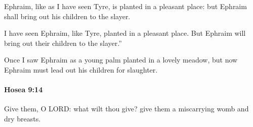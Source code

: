 			\begin{versebox}
					\item[BHS] 
					\item[LXX] 
					\item[ASV] Ephraim, like as I have seen Tyre, is planted in a pleasant place: but Ephraim shall bring out his children to the slayer.
					\item[NIV] I have seen Ephraim, like Tyre, planted in a pleasant place. But Ephraim will bring out their children to the slayer.”
					\item[NRSV] Once I saw Ephraim as a young palm planted in a lovely meadow, but now Ephraim must lead out his children for slaughter.
			\end{versebox}

		\paragraph{Hosea 9:14} %
			\label{HOSEA-9-14}

			Give them, O LORD: what wilt thou give? give them a miscarrying womb and dry breasts.

